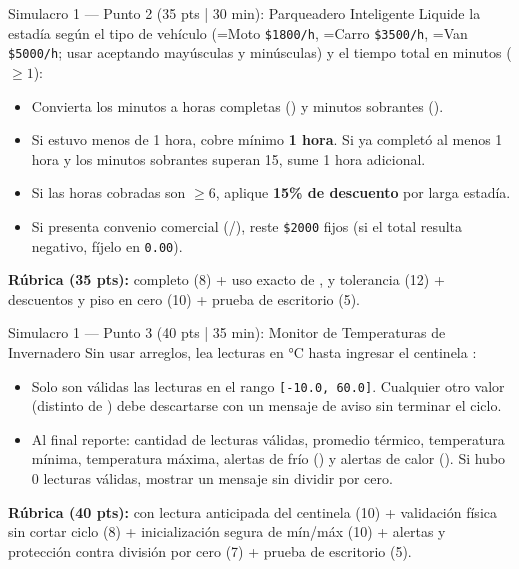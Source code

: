 \documentclass[11pt,letterpaper]{article}
\begin{document}
\begin{ejercicio}{Simulacro 1 — Punto 2 (35 pts | 30 min): Parqueadero Inteligente}
Liquide la estadía según el tipo de vehículo (=Moto \texttt{\$1800/h}, =Carro \texttt{\$3500/h}, =Van \texttt{\$5000/h}; usar  aceptando mayúsculas y minúsculas) y el tiempo total en minutos ($\ge 1$):
\begin{itemize}
  \item Convierta los minutos a horas completas () y minutos sobrantes ().
  \item Si estuvo menos de 1 hora, cobre mínimo \textbf{1 hora}. Si ya completó al menos 1 hora y los minutos sobrantes superan 15, sume 1 hora adicional.
  \item Si las horas cobradas son $\ge 6$, aplique \textbf{15\% de descuento} por larga estadía.
  \item Si presenta convenio comercial (/), reste \texttt{\$2000} fijos (si el total resulta negativo, fíjelo en \texttt{0.00}).
\end{itemize}
\textbf{Rúbrica (35 pts):}  completo (8) + uso exacto de \codigo{/}, \codigo{\%} y tolerancia (12) + descuentos y piso en cero (10) + prueba de escritorio (5).
\end{ejercicio}

\begin{ejercicio}{Simulacro 1 — Punto 3 (40 pts | 35 min): Monitor de Temperaturas de Invernadero}
Sin usar arreglos, lea lecturas en °C hasta ingresar el centinela :
\begin{itemize}
  \item Solo son válidas las lecturas en el rango \texttt{[-10.0, 60.0]}. Cualquier otro valor (distinto de ) debe descartarse con un mensaje de aviso sin terminar el ciclo.
  \item Al final reporte: cantidad de lecturas válidas, promedio térmico, temperatura mínima, temperatura máxima, alertas de frío () y alertas de calor (). Si hubo 0 lecturas válidas, mostrar un mensaje sin dividir por cero.
\end{itemize}
\textbf{Rúbrica (40 pts):}  con lectura anticipada del centinela (10) + validación física sin cortar ciclo (8) + inicialización segura de mín/máx (10) + alertas y protección contra división por cero (7) + prueba de escritorio (5).
\end{ejercicio}
\end{document}
